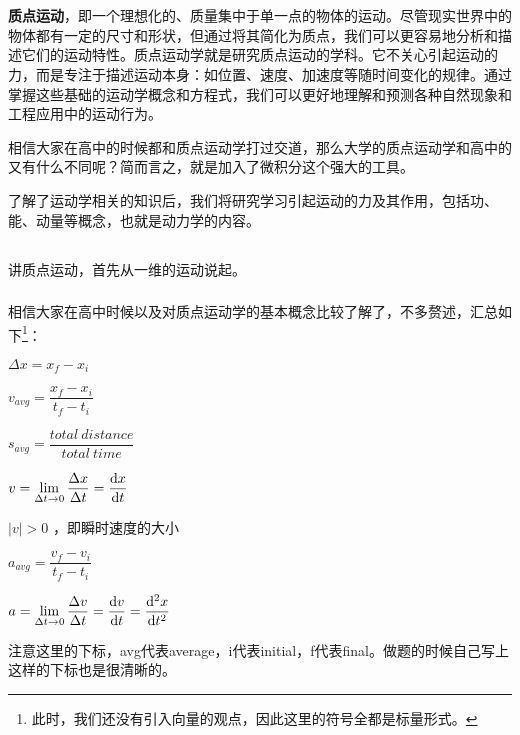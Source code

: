\chapter[质点运动学与动力学基础]{}
\textbf{质点运动}，即一个理想化的、质量集中于单一点的物体的运动。尽管现实世界中的物体都有一定的尺寸和形状，但通过将其简化为质点，我们可以更容易地分析和描述它们的运动特性。质点运动学就是研究质点运动的学科。它不关心引起运动的力，而是专注于描述运动本身：如位置、速度、加速度等随时间变化的规律。通过掌握这些基础的运动学概念和方程式，我们可以更好地理解和预测各种自然现象和工程应用中的运动行为。

相信大家在高中的时候都和质点运动学打过交道，那么大学的质点运动学和高中的又有什么不同呢？简而言之，就是加入了微积分这个强大的工具。

了解了运动学相关的知识后，我们将研究学习引起运动的力及其作用，包括功、能、动量等概念，也就是动力学的内容。
\section[一维运动]{}
讲质点运动，首先从一维的运动说起。
\subsection[质点运动学的基本概念]{}
相信大家在高中时候以及对质点运动学的基本概念比较了解了，不多赘述，汇总如下\footnote{此时，我们还没有引入向量的观点，因此这里的符号全都是标量形式。}：
\begin{Itemize}
       \item {} $\Delta x=x_{f} -x_{i}$
       \item {} $v_{avg} =\dfrac{x_{f}-x_{i}  }{t_{f}-t_{i}  } $
       \item {} $s_{avg} =\dfrac{total\ distance}{total\ time} $ 
       \item {} $\displaystyle v=\lim_{\Delta t \to 0} \frac{\Delta x}{\Delta t} =\frac{\dif  x}{\dif  t} $
\end{Itemize}
\begin{Itemize}
       \item {} $\left | v \right | >0$ ，即瞬时速度的大小
       \item {} $a_{avg} =\dfrac{v_{f}-v_{i}  }{t_{f}-t_{i}  } $
       \item {} $\displaystyle a=\lim_{\Delta t \to 0} \frac{\Delta v}{\Delta t} =\frac{\dif  v}{\dif  t} = \frac{\dif ^2x}{\dif  t^2} $
\end{Itemize}
注意这里的下标，avg代表average，i代表initial，f代表final。做题的时候自己写上这样的下标也是很清晰的。
